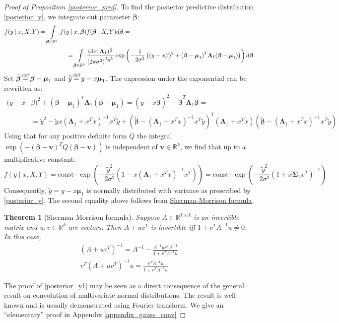 \documentclass[10pt,fleqn]{amsart}
\newtheorem{theorem}{Theorem}[section]
\theoremstyle{definition}
\theoremstyle{remark}
\numberwithin{equation}{section}
\newcommand{\RR}{\mathbb{R}}
\newcommand{\eq}{\stackrel{\mathclap{\normalfont\text{def}}}{=}}
\newcommand{\const}{\text{const}}
\newcommand{\bbeta}{\boldsymbol{\beta}}
\newcommand{\mmu}{\boldsymbol{\mu}}
\newcommand{\SSigma}{\boldsymbol{\Sigma}}
\newcommand{\LLambda}{\boldsymbol{\Lambda}}
\newcommand{\bbetatilde}{\widetilde{\bbeta}}
\newcommand{\ytilde}{\widetilde{y}}
\begin{document}
\begin{proof}[Proof of Proposition \ref{posterior_pred}]
\noindent To find the posterior predictive distribution \ref{posterior_y}, we integrate out parameter $\bbeta$:
\begin{equation*}\begin{split}
f(y\mid x,X,Y)=\int\displaylimits_{\bbeta\in\RR^k}f(y\mid x,\bbeta)&f(\bbeta\mid X,Y)d\bbeta=\\
=\int\displaylimits_{\bbeta\in\RR^k}&\frac {\left(\det\LLambda_1\right)^{\frac 12}}{\left(2\pi\sigma^2\right)^{\frac{1+k}2}}
\exp\left(-\frac 1{2\sigma^2}\left((y-x\beta)^2+(\bbeta-\mmu_1)^T\LLambda_1(\bbeta-\mmu_1)\right)\right)d\bbeta
\end{split}\end{equation*}
Set $\bbetatilde\eq\bbeta-\mmu_1$ and $\ytilde\eq y-x\mmu_1$. The expression under the exponential can be rewritten as:
\begin{equation*}\begin{split}
    (y-x&\beta)^2+(\bbeta-\mmu_1)^T\LLambda_1(\bbeta-\mmu_1)=
    \left(\ytilde-x\bbetatilde\right)^2+\bbetatilde^T\LLambda_1\bbetatilde=\\
    &=\ytilde^2-\ytilde x\left(\LLambda_1+x^Tx\right)^{-1}x^T\ytilde+
    \left(\bbetatilde-\left(\LLambda_1+x^Tx\right)^{-1}x^T\ytilde\right)^T\left(\LLambda_1+x^Tx\right)
    \left(\bbetatilde-\left(\LLambda_1+x^Tx\right)^{-1}x^T\ytilde\right)
\end{split}\end{equation*}
Using that for any positive definite form $Q$ the integral $\exp(-(\bbeta-\boldsymbol{v})^TQ(\bbeta-\boldsymbol{v}))$ is independent of $\boldsymbol{v}\in\RR^k$,
we find that up to a multiplicative constant:
\begin{equation*}
    f(y\mid x, X, Y)=\const\cdot \exp\left(-\frac {\ytilde^2}{2\sigma^2}\left(1-x\left(\LLambda_1+x^Tx\right)^{-1}x^T\right)\right)=
    \const\cdot \exp\left(-\frac {\ytilde^2}{2\sigma^2}\left(1+x\SSigma_1 x^T\right)^{-1}\right)
\end{equation*}
Consequently, $\ytilde=y-x\mmu_1$ is normally distributed with variance as prescribed by \ref{posterior_y}.
The second equality above follows from \href{https://en.wikipedia.org/wiki/Sherman%E2%80%93Morrison_formula}{Sherman-Morrison formula}.
\begin{theorem}[Sherman-Morrison formula]
    Suppose $A\in\RR^{k\times k}$ is an invertible matrix and $u,v\in \RR^k$ are vectors. Then $A+uv^T$  is invertible iff $1+v^TA^{-1}u\neq 0$.
    In this case,
    \begin{align}
        \left(A+uv^T\right)^{-1}=A^{-1}-\frac{A^{-1}uv^TA^{-1}}{1+v^TA^{-1}u}\\
        v^T\left(A+uv^T\right)^{-1}u=\frac{v^TA^{-1}u}{1+v^TA^{-1}u}
    \end{align}
\end{theorem}
The proof of \ref{posterior_y1} may be seen as a direct consequence of the general result on convolution of multivariate normal distributions.
The result is well-known and is usually demonstrated using Fourier transform.
We give an ``elementary'' proof in Appendix \ref{appendix_gauss_conv}
\end{proof}
\end{document}
